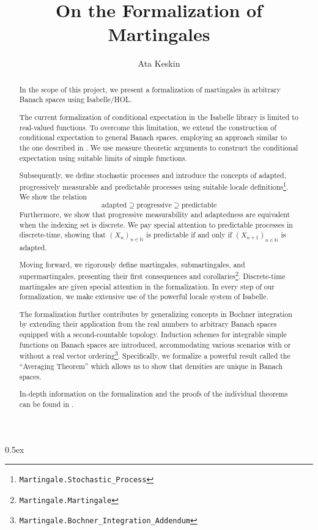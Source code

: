 ﻿\documentclass[11pt,a4paper]{article}
\begin{document}
\title{On the Formalization of Martingales}
\author{Ata Keskin}
\maketitle
\begin{abstract}
In the scope of this project, we present a formalization of martingales in arbitrary Banach spaces using Isabelle/HOL.

The current formalization of conditional expectation in the Isabelle library is limited to real-valued functions. To overcome this limitation, we extend the construction of conditional expectation to general Banach spaces, employing an approach similar to the one described in \cite{Hytoenen_2016}. We use measure theoretic arguments to construct the conditional expectation using suitable limits of simple functions.

Subsequently, we define stochastic processes and introduce the concepts of adapted, progressively measurable and predictable processes using suitable locale definitions\footnote{\texttt{Martingale.Stochastic\_Process}}. We show the relation
\[
	\text{adapted} \supseteq \text{progressive} \supseteq \text{predictable}
\]
Furthermore, we show that progressive measurability and adaptedness are equivalent when the indexing set is discrete.
We pay special attention to predictable processes in discrete-time, showing that $(X_n)_{n \in \mathbb{N}}$ is predictable if and only if $(X_{n + 1})_{n \in \mathbb{N}}$ is adapted.

Moving forward, we rigorously define martingales, submartingales, and supermartingales, presenting their first consequences and corollaries\footnote{\texttt{Martingale.Martingale}}. Discrete-time martingales are given special attention in the formalization. In every step of our formalization, we make extensive use of the powerful locale system of Isabelle.

The formalization further contributes by generalizing concepts in Bochner integration by extending their application from the real numbers to arbitrary Banach spaces equipped with a second-countable topology. Induction schemes for integrable simple functions on Banach spaces are introduced, accommodating various scenarios with or without a real vector ordering\footnote{\texttt{Martingale.Bochner\_Integration\_Addendum}}. Specifically, we formalize a powerful result called the ``Averaging Theorem''\cite{Lang_1993} which allows us to show that densities are unique in Banach spaces.

In-depth information on the formalization and the proofs of the individual theorems can be found in \cite{keskin2023formalization}.
\end{abstract}
\tableofcontents
\pagebreak

\parindent 0pt\parskip 0.5ex





\end{document}
